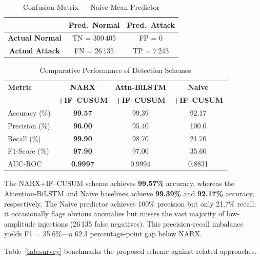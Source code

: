 \documentclass[journal]{IEEEtran}
\begin{document}
\begin{table}[!t]
\caption{Confusion Matrix --- Naive Mean Predictor}
\label{tab:cm_naive}
\centering
\begin{tabular}{|c|c|c|}
\hline
 & \textbf{Pred.\ Normal} & \textbf{Pred.\ Attack} \\
\hline
\textbf{Actual Normal} & TN = 300\,405 & FP = 0 \\
\hline
\textbf{Actual Attack} & FN = 26\,135  & TP = 7\,243 \\
\hline
\end{tabular}
\end{table}

\begin{table}[!t]
\caption{Comparative Performance of Detection Schemes}
\label{tab:compare}
\centering
\begin{tabular}{|l|c|c|c|}
\hline
\textbf{Metric} & \textbf{NARX} & \textbf{Attn-BiLSTM} & \textbf{Naive} \\
 & \textbf{+IF--CUSUM} & \textbf{+IF--CUSUM} & \textbf{+IF--CUSUM} \\
\hline
Accuracy (\%)   & \textbf{99.57} & 99.39 & 92.17 \\
Precision (\%)  & \textbf{96.00} & 95.40 & 100.0 \\
Recall (\%)     & \textbf{99.90} & 98.70 & 21.70 \\
F1-Score (\%)   & \textbf{97.90} & 97.00 & 35.60 \\
AUC-ROC         & \textbf{0.9997} & 0.9994 & 0.8831 \\
\hline
\end{tabular}
\end{table}

The NARX+IF--CUSUM scheme achieves \textbf{99.57\%} accuracy,
whereas the Attention-BiLSTM and Naive baselines achieve
\textbf{99.39\%} and \textbf{92.17\%} accuracy, respectively.
The Naive predictor achieves 100\% precision but only 21.7\% recall:
it occasionally flags obvious anomalies but misses the vast
majority of low-amplitude injections (26\,135 false negatives).
This precision-recall imbalance yields F1 = 35.6\%---a 62.3
percentage-point gap below NARX.

Table~\ref{tab:survey} benchmarks the proposed scheme against
related approaches.
\end{document}
